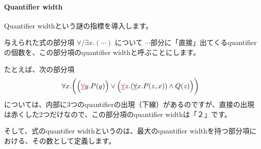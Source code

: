 \documentclass[a4paper,UKenglish,cleveref, autoref, thm-restate]{lipics-v2021}
\newenvironment{Jcomment}%
{\begin{screen}\begin{CJK}{UTF8}{ipxm}}%
{\end{CJK}\end{screen}}
\begin{document}
\paragraph*{Quantifier width}
\begin{Jcomment}
Quantifier widthという謎の指標を導入します。

与えられた式の部分項 $\forall/\exists x. ( \cdots )$ について $\cdots$部分に「直接」出てくるquantifierの個数を、この部分項のquantifier widthと呼ぶことにします。

たとえば、次の部分項
$$
\forall x.\biggl( \Bigl(\underline{{\color{red}\forall}} y. P(y)\Bigr) \lor \Bigl(\underline{{\color{red}\forall}} z. (\underline{\forall} x. P(z, x)) \land Q(z)\Bigr) \biggr)
$$
については、内部に3つのquantifierの出現（下線）があるのですが、直接の出現は赤くした2つだけなので、この部分項のquantifier widthは「２」です。

そして、式のquantifier widthというのは、最大のquantifier widthを持つ部分項における、その数として定義します。
\end{Jcomment}







\end{document}
